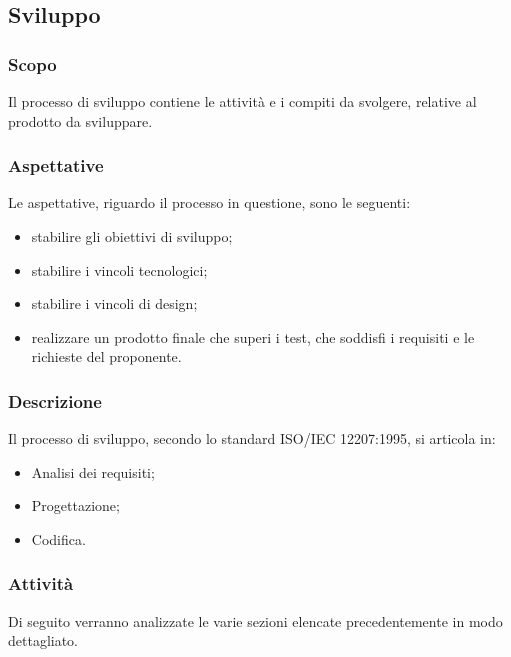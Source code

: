 	\subsection{Sviluppo}
		\subsubsection{Scopo}
		Il processo di sviluppo contiene le attività e i compiti da svolgere, relative al prodotto da sviluppare.
		\subsubsection{Aspettative}
		Le aspettative, riguardo il processo in questione, sono le seguenti:
		\begin{itemize}
			\item stabilire gli obiettivi di sviluppo;
			\item stabilire i vincoli tecnologici;
			\item stabilire i vincoli di design;
			\item realizzare un prodotto finale che superi i test, che soddisfi i requisiti e le richieste del proponente.
		\end{itemize}
		\subsubsection{Descrizione}
		Il processo di sviluppo, secondo lo standard ISO/IEC 12207:1995, si articola in:
		\begin{itemize}
			\item Analisi dei requisiti;
			\item Progettazione;
			\item Codifica.
		\end{itemize}
		\subsubsection{Attività}
		Di seguito verranno analizzate le varie sezioni elencate precedentemente in modo dettagliato.
